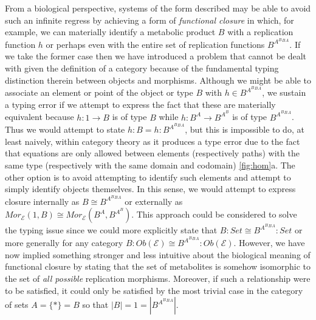 From a biological perspective, systems of the form described may be able to avoid such an infinite regress by achieving a form of \emph{functional closure} in which, for example, we can materially identify a metabolic product $B$ with a replication function $h$ or perhaps even with the entire set of replication functions $B^{A^B{^B{^A}}}$. If we take the former case then we have introduced a problem that cannot be dealt with given the definition of a category because of the fundamental typing distinction therein between objects and morphisms. Although we might be able to associate an element or point of the object or type $B$ with $h \in B^{A^B{^B{^A}}}$, we sustain a typing error if we attempt to express the fact that these are materially equivalent because $h \colon 1 \rightarrow B$ is of type $B$ while $h \colon B^A \rightarrow B^{A^B}$ is of type $B^{A^B{^B{^A}}}$. Thus we would attempt to state $h:B = h:B^{A^B{^B{^A}}}$, but this is impossible to do, at least naively, within category theory as it produces a type error due to the fact that equations are only allowed between elements (respectively paths) with the same type (respectively with the same domain and codomain) \ref{fig:hom}a. The other option is to avoid attempting to identify such elements and attempt to simply identify objects themselves. In this sense, we would attempt to express closure internally as $B \cong B^{A^B{^B{^A}}}$ or externally as $Mor_{\mathcal{E}}(1,B) \cong Mor_{\mathcal{E}}(B^A,B^{A^B})$. This approach could be considered to solve the typing issue since we could more explicitly state that $B \colon Set \cong B^{A^B{^B{^A}}} \colon Set$ or more generally for any category $B \colon Ob(\mathcal{E}) \cong B^{A^B{^B{^A}}} \colon Ob(\mathcal{E})$. However, we have now implied something stronger and less intuitive about the biological meaning of functional closure by stating that the set of metabolites is somehow isomorphic to the set of \emph{all possible} replication morphisms. Moreover, if such a relationship were to be satisfied, it could only be satisfied by the most trivial case in the category of sets $A = \{*\} = B$ so that $|B|=1=|B^{A^B{^B{^A}}}|$.

